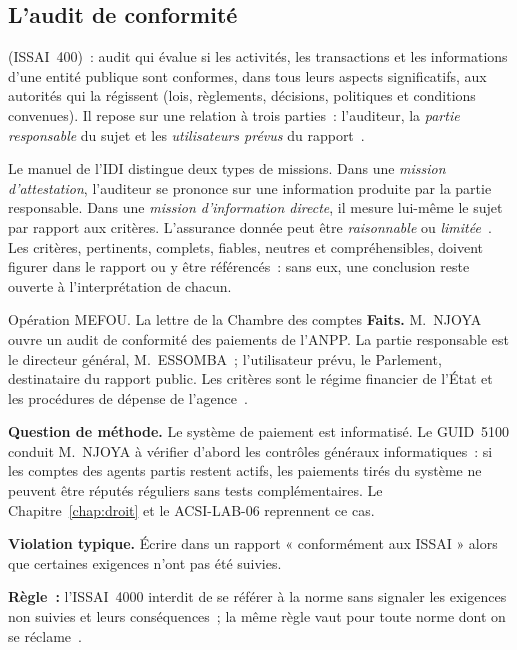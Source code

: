 \subsection{L'audit de conformité}

\begin{boxdef}
 (ISSAI~400)~:
audit qui évalue si les activités, les transactions et les informations
d'une entité publique sont conformes, dans tous leurs aspects
significatifs, aux autorités qui la régissent (lois, règlements,
décisions, politiques et conditions convenues). Il repose sur une relation
à trois parties~: l'auditeur, la \emph{partie responsable} du sujet et les
\emph{utilisateurs prévus} du rapport~\cite{idi2021conformite}.
\end{boxdef}

Le manuel de l'IDI distingue deux types de missions. Dans une \emph{mission
d'attestation}, l'auditeur se prononce sur une information produite par la
partie responsable. Dans une \emph{mission d'information directe}, il
mesure lui-même le sujet par rapport aux critères. L'assurance donnée peut
être \emph{raisonnable} ou \emph{limitée}~\cite{idi2021conformite}. Les
critères, pertinents, complets, fiables, neutres et compréhensibles, doivent
figurer dans le rapport ou y être référencés~: sans eux, une conclusion
reste ouverte à l'interprétation de chacun.

\begin{boxscenario}{Opération MEFOU. La lettre de la Chambre des comptes}
\textbf{Faits.} M.~NJOYA ouvre un audit de conformité des paiements de
l'ANPP. La partie responsable est le directeur général, M.~ESSOMBA~;
l'utilisateur prévu, le Parlement, destinataire du rapport public. Les
critères sont le régime financier de l'État et les procédures de dépense
de l'agence~\cite{minfi2023regimefinancier}.

\medskip
\textbf{Question de méthode.} Le système de paiement est informatisé. Le
GUID~5100 conduit M.~NJOYA à vérifier d'abord les contrôles généraux
informatiques~: si les comptes des agents partis restent actifs, les
paiements tirés du système ne peuvent être réputés réguliers sans tests
complémentaires. Le Chapitre~\ref{chap:droit} et le ACSI-LAB-06 reprennent ce
cas.
\end{boxscenario}

\begin{boxalert}
\textbf{Violation typique.} Écrire dans un rapport « conformément aux
ISSAI » alors que certaines exigences n'ont pas été suivies.

\smallskip
\textbf{Règle~:} l'ISSAI~4000 interdit de se référer à la norme sans
signaler les exigences non suivies et leurs conséquences~; la même règle
vaut pour toute norme dont on se réclame~\cite{idi2021conformite}.
\end{boxalert}

